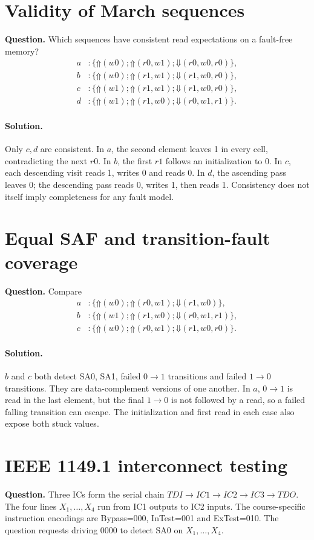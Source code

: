 \documentclass[11pt]{article}
\newcommand{\sol}{\paragraph{Solution.}}
\newcommand{\up}{\mathord{\Uparrow}}
\newcommand{\dn}{\mathord{\Downarrow}}
\begin{document}
\section{Validity of March sequences}
\textbf{Question.} Which sequences have consistent read expectations on a
fault-free memory?
\begin{align*}
a&:\{\up(w0);\up(r0,w1);\dn(r0,w0,r0)\},\\
b&:\{\up(w0);\up(r1,w1);\dn(r1,w0,r0)\},\\
c&:\{\up(w1);\up(r1,w1);\dn(r1,w0,r0)\},\\
d&:\{\up(w1);\up(r1,w0);\dn(r0,w1,r1)\}.
\end{align*}
\sol Only $c,d$ are consistent.
In $a$, the second element leaves 1 in every cell, contradicting the next $r0$.
In $b$, the first $r1$ follows an initialization to 0.
In $c$, each descending visit reads 1, writes 0 and reads 0.
In $d$, the ascending pass leaves 0; the descending pass reads 0, writes 1,
then reads 1. Consistency does not itself imply completeness for any fault model.

\section{Equal SAF and transition-fault coverage}
\textbf{Question.} Compare
\begin{align*}
a&:\{\up(w0);\up(r0,w1);\dn(r1,w0)\},\\
b&:\{\up(w1);\up(r1,w0);\dn(r0,w1,r1)\},\\
c&:\{\up(w0);\up(r0,w1);\dn(r1,w0,r0)\}.
\end{align*}
\sol $b$ and $c$ both detect SA0, SA1, failed $0\to1$ transitions and
failed $1\to0$ transitions. They are data-complement versions of one another.
In $a$, $0\to1$ is read in the last element, but the final $1\to0$ is not
followed by a read, so a failed falling transition can escape.
The initialization and first read in each case also expose both stuck values.

\section{IEEE 1149.1 interconnect testing}
\textbf{Question.} Three ICs form the serial chain
$TDI\to IC1\to IC2\to IC3\to TDO$.
The four lines $X_1,\ldots,X_4$ run from IC1 outputs to IC2 inputs.
The course-specific instruction encodings are
Bypass=000, InTest=001 and ExTest=010.
The question requests driving 0000 to detect SA0 on $X_1,\ldots,X_4$.\begin{center}\end{center}
\end{document}

